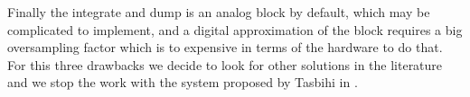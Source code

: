 Finally the integrate and dump is an analog block by default, which may be complicated to implement, and a digital approximation of the block requires a big oversampling factor which is to expensive in terms of the hardware to do that.\\

For this three drawbacks we decide to look for other solutions in the literature and we stop the work with the system proposed by Tasbihi in \cite{Tasbihi_Tukey}.


































